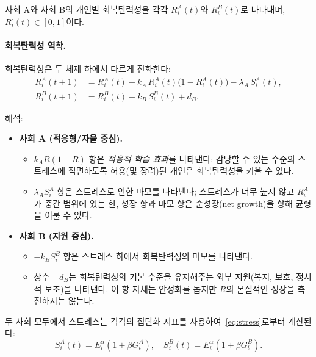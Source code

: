 \documentclass[11pt]{article}
\theoremstyle{plain}
\begin{document}
사회 A와 사회 B의 개인별 회복탄력성을 각각 $R_i^A(t)$와 $R_i^B(t)$로 나타내며, $R_i^\cdot(t) \in [0,1]$이다.

\paragraph{회복탄력성 역학.}
회복탄력성은 두 체제 하에서 다르게 진화한다:
\begin{align}
R_i^A(t+1) &= R_i^A(t)
+ k_A\, R_i^A(t)\bigl(1 - R_i^A(t)\bigr)
- \lambda_A\, S_i^A(t), \label{eq:RA}\\
R_i^B(t+1) &= R_i^B(t)
- k_B\, S_i^B(t)
+ d_B. \label{eq:RB}
\end{align}

해석:
\begin{itemize}
  \item \textbf{사회 A (적응형/자율 중심).}
  \begin{itemize}
    \item $k_A R(1-R)$ 항은 \emph{적응적 학습 효과}를 나타낸다: 감당할 수 있는 수준의 스트레스에 직면하도록 허용(및 장려)된 개인은 회복탄력성을 키울 수 있다.
    \item $\lambda_A S_i^A$ 항은 스트레스로 인한 마모를 나타낸다; 스트레스가 너무 높지 않고 $R_i^A$가 중간 범위에 있는 한, 성장 항과 마모 항은 순성장(net growth)을 향해 균형을 이룰 수 있다.
  \end{itemize}

  \item \textbf{사회 B (지원 중심).}
  \begin{itemize}
    \item $-k_B S_i^B$ 항은 스트레스 하에서 회복탄력성의 마모를 나타낸다.
    \item 상수 $+d_B$는 회복탄력성의 기본 수준을 유지해주는 외부 지원(복지, 보호, 정서적 보조)을 나타낸다.
      이 항 자체는 안정화를 돕지만 $R$의 본질적인 성장을 촉진하지는 않는다.
  \end{itemize}
\end{itemize}

두 사회 모두에서 스트레스는 각각의 집단화 지표를 사용하여~\eqref{eq:stress}로부터 계산된다:
\[
S_i^A(t) = E_i^{\alpha} (1 + \beta G_t^A), \quad
S_i^B(t) = E_i^{\alpha} (1 + \beta G_t^B).
\]
\end{document}
